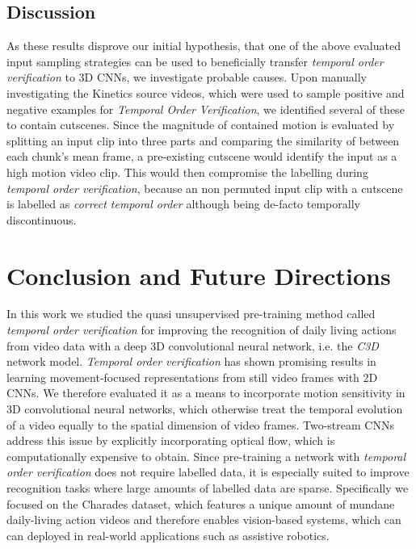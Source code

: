 \subsection{Discussion}
As these results disprove our initial hypothesis, that one of the above evaluated input sampling strategies can be used to beneficially transfer \textit{temporal order verification} to 3D CNNs, we investigate probable causes.
Upon manually investigating the Kinetics source videos, which were used to sample positive and negative examples for \textit{Temporal Order Verification}, we identified several of these to contain cutscenes.
Since the magnitude of contained motion is evaluated by splitting an input clip into three parts and comparing the similarity of between each chunk's mean frame, a pre-existing cutscene would identify the input as a high motion video clip.
This would then compromise the labelling during \textit{temporal order verification}, because an non permuted input clip with a cutscene is labelled as \textit{correct temporal order} although being de-facto temporally discontinuous.


\newpage
\section{Conclusion and Future Directions}
In this work we studied the quasi unsupervised pre-training method called \textit{temporal order verification} for improving the recognition of daily living actions from video data with a deep 3D convolutional neural network, i.e. the \textit{C3D} network model.
\textit{Temporal order verification} has shown promising results in learning movement-focused representations from still video frames with 2D CNNs. 
We therefore evaluated it as a means to incorporate motion sensitivity in 3D convolutional neural networks, which otherwise treat the temporal evolution of a video equally to the spatial dimension of video frames.
Two-stream CNNs address this issue by explicitly incorporating optical flow, which is computationally expensive to obtain.
Since pre-training a network with \textit{temporal order verification} does not require labelled data, it is especially suited to improve recognition tasks where large amounts of labelled data are sparse.
Specifically we focused on the Charades dataset, which features a unique amount of mundane daily-living action videos and therefore enables vision-based systems, which can can deployed in real-world applications such as assistive robotics.

